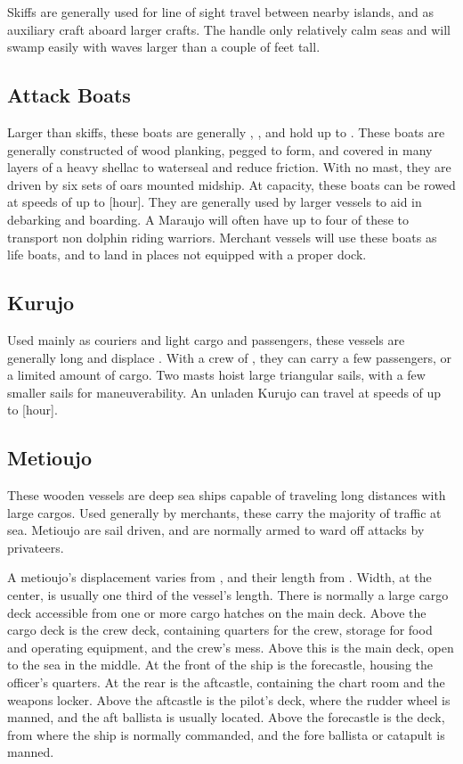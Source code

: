 \begin{multicols*}{2}
Skiffs are generally used for line of sight travel between nearby islands, and as auxiliary craft aboard larger crafts. The handle only relatively calm seas and will swamp
easily with waves larger than a couple of feet tall.
\subsection{Attack Boats}
Larger than skiffs, these boats are generally , , and hold up to . These boats are generally constructed of wood planking, pegged to form, and covered in many layers of a heavy shellac to waterseal and reduce friction. With no mast, they are driven by six sets of oars mounted midship. At capacity, these boats can be rowed at speeds of up to [hour]. They are generally used by larger vessels to aid in debarking and boarding. A Maraujo will often have up to four of these to transport non dolphin riding warriors. Merchant vessels will use these boats as life boats, and to land in places not equipped with a proper dock.
\subsection{Kurujo}
Used mainly as couriers and light cargo and passengers, these vessels are generally  long and displace . With a crew of , they can carry a few passengers, or a limited amount of cargo. Two masts hoist large triangular sails, with a few smaller sails for maneuverability. An unladen Kurujo can travel at speeds of up to [hour].
\subsection{Metioujo}
These wooden vessels are deep sea ships capable of traveling long distances with large cargos. Used generally by merchants, these carry the majority of traffic at sea. Metioujo are sail driven, and are normally armed to ward off attacks by privateers.

A metioujo's displacement varies from , and their length from . Width, at the center, is usually one third of the vessel's length. There is normally a large cargo deck accessible from one or more cargo hatches on the main deck. Above the cargo deck is the crew deck, containing quarters for the crew, storage for food and operating equipment, and the crew's mess. Above this is the main deck, open to the sea in the middle. At the front of the ship is the forecastle, housing the officer's quarters. At the
rear is the aftcastle, containing the chart room and the weapons locker. Above the aftcastle is the pilot's deck, where the rudder wheel is manned, and the aft ballista is usually
located. Above the forecastle is the  deck, from where the ship is normally commanded, and the fore ballista or catapult is manned.


\end{multicols*}
